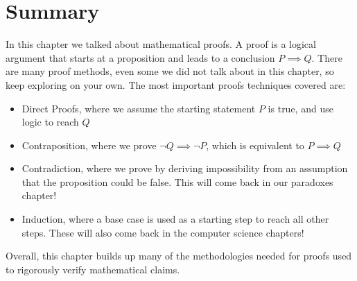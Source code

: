 \section{Summary}
In this chapter we talked about mathematical proofs. A proof is a logical argument that starts at a proposition and leads to a conclusion $P\implies Q$.
There are many proof methods, even some we did not talk about in this chapter, so keep exploring on your own. The most important proofs techniques covered are:
\begin{itemize}
    \item Direct Proofs, where we assume the starting statement $P$ is true, and use logic to reach $Q$
    \item Contraposition, where we prove $\neg Q \implies \neg P$, which is equivalent to $P \implies Q$
    \item Contradiction, where we prove by deriving impossibility from an assumption that the proposition could be false. This will come back in our paradoxes chapter!
    \item Induction, where a base case is used as a starting step to reach all other steps. These will also come back in the computer science chapters!
\end{itemize}
Overall, this chapter builds up many of the methodologies needed for proofs used to rigorously verify mathematical claims.